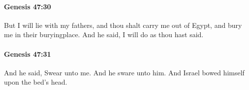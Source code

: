 		\paragraph{Genesis 47:30} %
			\label{GENESIS-47-30}

			But I will lie with my fathers, and thou shalt carry me out of Egypt, and bury me in their buryingplace. And he said, I will do as thou hast said.


		\paragraph{Genesis 47:31} %
			\label{GENESIS-47-31}

			And he said, Swear unto me. And he sware unto him. And Israel bowed himself upon the bed's head.

